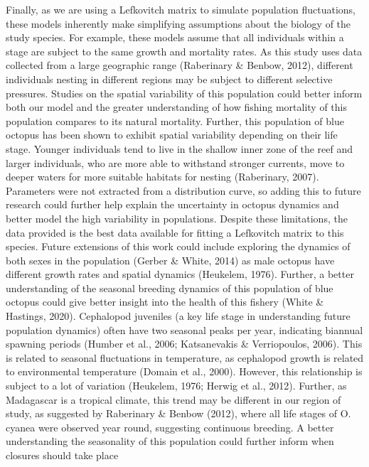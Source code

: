 \documentclass[
]{article}
\begin{document}
Finally, as we are using a Lefkovitch matrix to simulate population fluctuations, these models inherently make simplifying assumptions about the biology of the study species. For example, these models assume that all individuals within a stage are subject to the same growth and mortality rates. As this study uses data collected from a large geographic range (Raberinary \& Benbow, 2012), different individuals nesting in different regions may be subject to different selective pressures. Studies on the spatial variability of this population could better inform both our model and the greater understanding of how fishing mortality of this population compares to its natural mortality. Further, this population of blue octopus has been shown to exhibit spatial variability depending on their life stage. Younger individuals tend to live in the shallow inner zone of the reef and larger individuals, who are more able to withstand stronger currents, move to deeper waters for more suitable habitats for nesting (Raberinary, 2007). Parameters were not extracted from a distribution curve, so adding this to future research could further help explain the uncertainty in octopus dynamics and better model the high variability in populations. Despite these limitations, the data provided is the best data available for fitting a Lefkovitch matrix to this species. Future extensions of this work could include exploring the dynamics of both sexes in the population (Gerber \& White, 2014) as male octopus have different growth rates and spatial dynamics (Heukelem, 1976). Further, a better understanding of the seasonal breeding dynamics of this population of blue octopus could give better insight into the health of this fishery (White \& Hastings, 2020). Cephalopod juveniles (a key life stage in understanding future population dynamics) often have two seasonal peaks per year, indicating biannual spawning periods (Humber et al., 2006; Katsanevakis \& Verriopoulos, 2006). This is related to seasonal fluctuations in temperature, as cephalopod growth is related to environmental temperature (Domain et al., 2000). However, this relationship is subject to a lot of variation (Heukelem, 1976; Herwig et al., 2012). Further, as Madagascar is a tropical climate, this trend may be different in our region of study, as suggested by Raberinary \& Benbow (2012), where all life stages of O. cyanea were observed year round, suggesting continuous breeding. A better understanding the seasonality of this population could further inform when closures should take place
\end{document}
